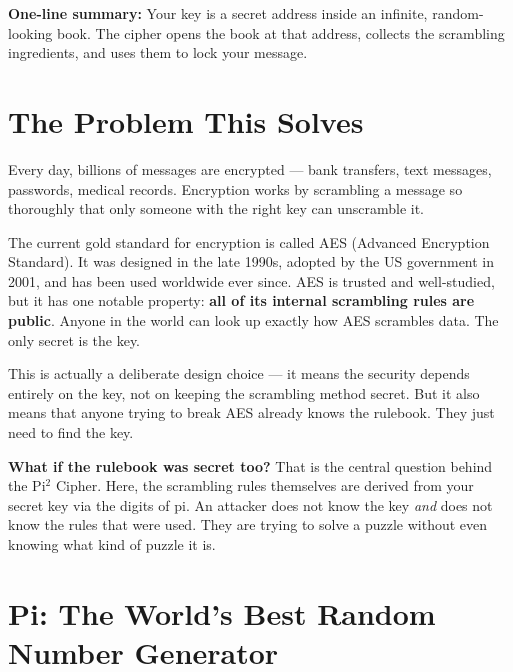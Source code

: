 \documentclass[12pt, a4paper]{article}
\begin{document}
\begin{greenbox}
\textbf{One-line summary:} Your key is a secret address inside an infinite, random-looking book. The cipher opens the book at that address, collects the scrambling ingredients, and uses them to lock your message.
\end{greenbox}

\section{The Problem This Solves}

\vspace{0.5em}

Every day, billions of messages are encrypted --- bank transfers, text messages, passwords, medical records. Encryption works by scrambling a message so thoroughly that only someone with the right key can unscramble it.

The current gold standard for encryption is called AES (Advanced Encryption Standard). It was designed in the late 1990s, adopted by the US government in 2001, and has been used worldwide ever since. AES is trusted and well-studied, but it has one notable property: \textbf{all of its internal scrambling rules are public}. Anyone in the world can look up exactly how AES scrambles data. The only secret is the key.

This is actually a deliberate design choice --- it means the security depends entirely on the key, not on keeping the scrambling method secret. But it also means that anyone trying to break AES already knows the rulebook. They just need to find the key.

\begin{bluebox}
\textbf{What if the rulebook was secret too?} That is the central question behind the Pi$^2$ Cipher. Here, the scrambling rules themselves are derived from your secret key via the digits of pi. An attacker does not know the key \textit{and} does not know the rules that were used. They are trying to solve a puzzle without even knowing what kind of puzzle it is.
\end{bluebox}

\section{Pi: The World's Best Random Number Generator}
\end{document}
